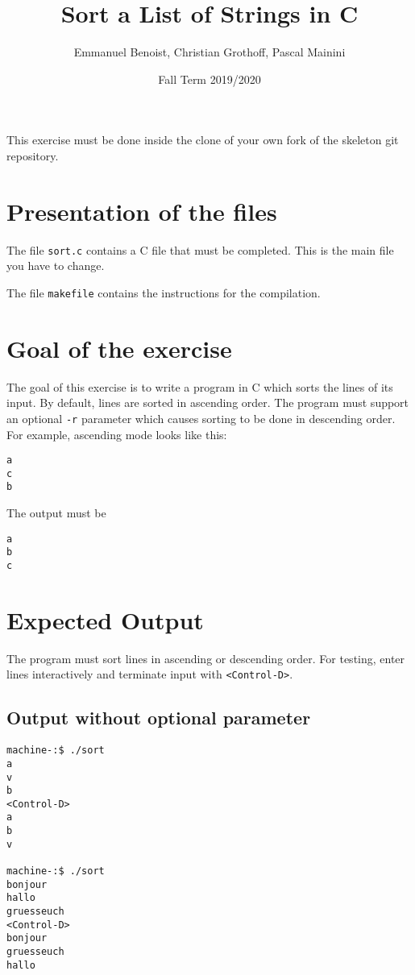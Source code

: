 \documentclass{scrartcl}
\title{Sort a List of Strings in C}
\author{Emmanuel Benoist, Christian Grothoff, Pascal Mainini}
\date{Fall Term 2019/2020}
\begin{document}
\maketitle

This exercise must be done inside the clone of your own fork of the skeleton git repository.

\section{Presentation of the files}



The file \texttt{sort.c} contains a C file that must be completed. This is the main file you have to change.

The file \texttt{makefile} contains the instructions for the compilation. 

\section{Goal of the exercise}

The goal of this exercise is to write a program in C which sorts the lines of its input. By default, lines are sorted in ascending order. The program must support an optional \texttt{-r} parameter which causes sorting to be done in descending order. For example, ascending mode looks like this:

\begin{lstlisting}
a
c
b
\end{lstlisting}

The output must be
\begin{lstlisting}
a
b
c
\end{lstlisting}


\section{Expected Output}

The program must sort lines in ascending or descending order. For testing, enter lines interactively and terminate input with \texttt{<Control-D>}.

\subsection{Output without optional parameter}

\begin{lstlisting}
machine-:$ ./sort
a
v
b
<Control-D>
a
b
v

machine-:$ ./sort
bonjour
hallo
gruesseuch
<Control-D>
bonjour
gruesseuch
hallo
\end{lstlisting}
\end{document}
